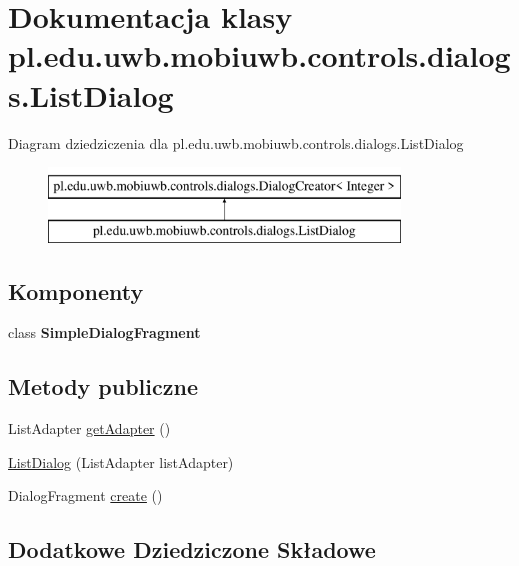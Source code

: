 \hypertarget{classpl_1_1edu_1_1uwb_1_1mobiuwb_1_1controls_1_1dialogs_1_1_list_dialog}{}\section{Dokumentacja klasy pl.\+edu.\+uwb.\+mobiuwb.\+controls.\+dialogs.\+List\+Dialog}
\label{classpl_1_1edu_1_1uwb_1_1mobiuwb_1_1controls_1_1dialogs_1_1_list_dialog}
Diagram dziedziczenia dla pl.\+edu.\+uwb.\+mobiuwb.\+controls.\+dialogs.\+List\+Dialog\begin{figure}[H]
\begin{center}
\leavevmode
\includegraphics[height=2.000000cm]{classpl_1_1edu_1_1uwb_1_1mobiuwb_1_1controls_1_1dialogs_1_1_list_dialog}
\end{center}
\end{figure}
\subsection*{Komponenty}
\begin{DoxyCompactItemize}
\item 
class {\bfseries Simple\+Dialog\+Fragment}
\end{DoxyCompactItemize}
\subsection*{Metody publiczne}
\begin{DoxyCompactItemize}
\item 
List\+Adapter \hyperlink{classpl_1_1edu_1_1uwb_1_1mobiuwb_1_1controls_1_1dialogs_1_1_list_dialog_a73b27bc9d354872a3293d595f1cca851}{get\+Adapter} ()
\item 
\hyperlink{classpl_1_1edu_1_1uwb_1_1mobiuwb_1_1controls_1_1dialogs_1_1_list_dialog_add8536fa5da85a8aec7d49f7a15074b2}{List\+Dialog} (List\+Adapter list\+Adapter)
\item 
Dialog\+Fragment \hyperlink{classpl_1_1edu_1_1uwb_1_1mobiuwb_1_1controls_1_1dialogs_1_1_list_dialog_ab30cc858c87597e92a5c360727703438}{create} ()
\end{DoxyCompactItemize}
\subsection*{Dodatkowe Dziedziczone Składowe}


